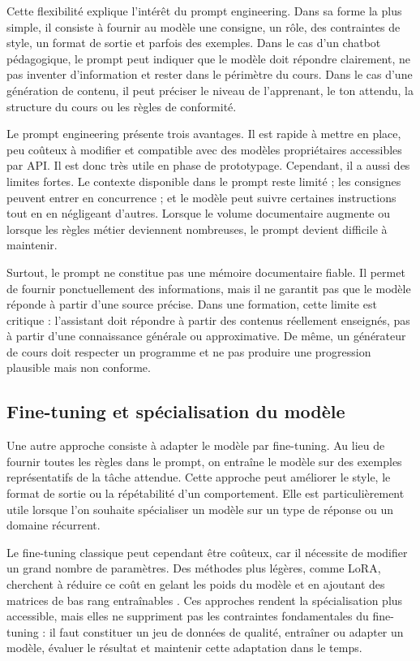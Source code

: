 \documentclass[12pt,a4paper]{article}
\begin{document}
Cette flexibilité explique l'intérêt du prompt engineering. Dans sa forme la plus simple,
il consiste à fournir au modèle une consigne, un rôle, des contraintes de style, un format
de sortie et parfois des exemples. Dans le cas d'un chatbot pédagogique, le prompt peut
indiquer que le modèle doit répondre clairement, ne pas inventer d'information et rester
dans le périmètre du cours. Dans le cas d'une génération de contenu, il peut préciser le
niveau de l'apprenant, le ton attendu, la structure du cours ou les règles de conformité.

Le prompt engineering présente trois avantages. Il est rapide à mettre en place, peu
coûteux à modifier et compatible avec des modèles propriétaires accessibles par API. Il
est donc très utile en phase de prototypage. Cependant, il a aussi des limites fortes. Le
contexte disponible dans le prompt reste limité ; les consignes peuvent entrer en
concurrence ; et le modèle peut suivre certaines instructions tout en en négligeant
d'autres. Lorsque le volume documentaire augmente ou lorsque les règles métier deviennent
nombreuses, le prompt devient difficile à maintenir.

Surtout, le prompt ne constitue pas une mémoire documentaire fiable. Il permet de
fournir ponctuellement des informations, mais il ne garantit pas que le modèle réponde
à partir d'une source précise. Dans une formation, cette limite est critique : l'assistant
doit répondre à partir des contenus réellement enseignés, pas à partir d'une connaissance
générale ou approximative. De même, un générateur de cours doit respecter un programme
et ne pas produire une progression plausible mais non conforme.

\subsection{Fine-tuning et spécialisation du modèle}

Une autre approche consiste à adapter le modèle par fine-tuning. Au lieu de fournir toutes
les règles dans le prompt, on entraîne le modèle sur des exemples représentatifs de la
tâche attendue. Cette approche peut améliorer le style, le format de sortie ou la
répétabilité d'un comportement. Elle est particulièrement utile lorsque l'on souhaite
spécialiser un modèle sur un type de réponse ou un domaine récurrent.

Le fine-tuning classique peut cependant être coûteux, car il nécessite de modifier un
grand nombre de paramètres. Des méthodes plus légères, comme LoRA, cherchent à
réduire ce coût en gelant les poids du modèle et en ajoutant des matrices de bas rang
entraînables \cite{hu2021lora}. Ces approches rendent la spécialisation plus accessible,
mais elles ne suppriment pas les contraintes fondamentales du fine-tuning : il faut
constituer un jeu de données de qualité, entraîner ou adapter un modèle, évaluer le
résultat et maintenir cette adaptation dans le temps.
\end{document}
